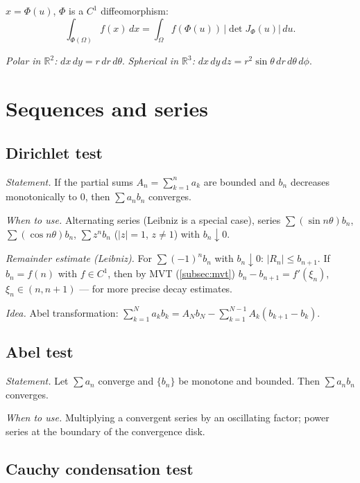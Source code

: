 $x=\Phi(u)$, $\Phi$ is a $C^1$ diffeomorphism:
$$\int_{\Phi(\Omega)} f(x)\,dx = \int_\Omega f(\Phi(u))\,|\det J_\Phi(u)|\,du.$$

\textit{Polar in $\mathbb{R}^2$:} $dx\,dy = r\,dr\,d\theta$. \textit{Spherical in $\mathbb{R}^3$:} $dx\,dy\,dz = r^2\sin\theta\,dr\,d\theta\,d\phi$.

\medskip

\section{Sequences and series}
\label{sec:series}

\subsection{Dirichlet test}
\label{subsec:dirichlet}

\textit{Statement.} If the partial sums $A_n=\sum_{k=1}^n a_k$ are bounded and $b_n$ decreases monotonically to $0$, then $\sum a_n b_n$ converges.

\textit{When to use.} Alternating series (Leibniz is a special case), series $\sum (\sin n\theta) b_n$, $\sum (\cos n\theta) b_n$, $\sum z^n b_n$ ($|z|=1$, $z\neq1$) with $b_n\downarrow0$.

\textit{Remainder estimate (Leibniz).} For $\sum(-1)^n b_n$ with $b_n\downarrow0$: $|R_n|\le b_{n+1}$. If $b_n=f(n)$ with $f\in C^1$, then by MVT (\ref{subsec:mvt}) $b_n-b_{n+1}=f'(\xi_n)$, $\xi_n\in(n,n+1)$ --- for more precise decay estimates.

\textit{Idea.} Abel transformation: $\sum_{k=1}^N a_k b_k = A_N b_N - \sum_{k=1}^{N-1} A_k (b_{k+1}-b_k)$.

\medskip

\subsection{Abel test}
\label{subsec:abel}

\textit{Statement.} Let $\sum a_n$ converge and $\{b_n\}$ be monotone and bounded. Then $\sum a_n b_n$ converges.

\textit{When to use.} Multiplying a convergent series by an oscillating factor; power series at the boundary of the convergence disk.

\medskip

\subsection{Cauchy condensation test}
\label{subsec:condensation}

